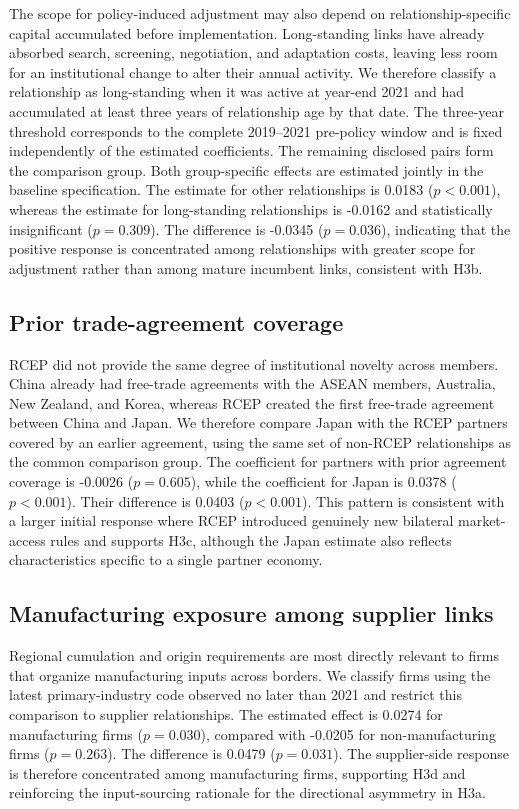 \documentclass[preprint,12pt,authoryear]{elsarticle}
\begin{document}
The scope for policy-induced adjustment may also depend on relationship-specific capital accumulated before implementation. Long-standing links have already absorbed search, screening, negotiation, and adaptation costs, leaving less room for an institutional change to alter their annual activity. We therefore classify a relationship as long-standing when it was active at year-end 2021 and had accumulated at least three years of relationship age by that date. The three-year threshold corresponds to the complete 2019--2021 pre-policy window and is fixed independently of the estimated coefficients. The remaining disclosed pairs form the comparison group. Both group-specific effects are estimated jointly in the baseline specification. The estimate for other relationships is 0.0183 ($p<0.001$), whereas the estimate for long-standing relationships is -0.0162 and statistically insignificant ($p=0.309$). The difference is -0.0345 ($p=0.036$), indicating that the positive response is concentrated among relationships with greater scope for adjustment rather than among mature incumbent links, consistent with H3b.

\subsection{Prior trade-agreement coverage}

RCEP did not provide the same degree of institutional novelty across members. China already had free-trade agreements with the ASEAN members, Australia, New Zealand, and Korea, whereas RCEP created the first free-trade agreement between China and Japan. We therefore compare Japan with the RCEP partners covered by an earlier agreement, using the same set of non-RCEP relationships as the common comparison group. The coefficient for partners with prior agreement coverage is -0.0026 ($p=0.605$), while the coefficient for Japan is 0.0378 ($p<0.001$). Their difference is 0.0403 ($p<0.001$). This pattern is consistent with a larger initial response where RCEP introduced genuinely new bilateral market-access rules and supports H3c, although the Japan estimate also reflects characteristics specific to a single partner economy.

\subsection{Manufacturing exposure among supplier links}

Regional cumulation and origin requirements are most directly relevant to firms that organize manufacturing inputs across borders. We classify firms using the latest primary-industry code observed no later than 2021 and restrict this comparison to supplier relationships. The estimated effect is 0.0274 for manufacturing firms ($p=0.030$), compared with -0.0205 for non-manufacturing firms ($p=0.263$). The difference is 0.0479 ($p=0.031$). The supplier-side response is therefore concentrated among manufacturing firms, supporting H3d and reinforcing the input-sourcing rationale for the directional asymmetry in H3a.
\end{document}
